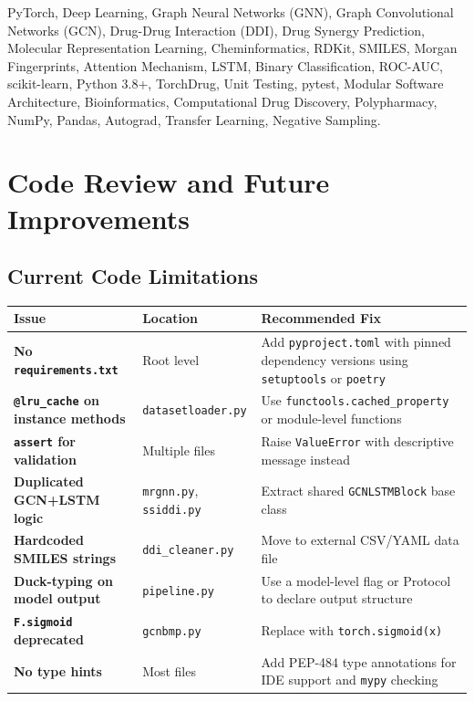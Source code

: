 \documentclass[12pt,a4paper,oneside]{book}
\begin{document}
PyTorch, Deep Learning, Graph Neural Networks (GNN), Graph Convolutional Networks (GCN),
Drug-Drug Interaction (DDI), Drug Synergy Prediction, Molecular Representation Learning,
Cheminformatics, RDKit, SMILES, Morgan Fingerprints, Attention Mechanism, LSTM,
Binary Classification, ROC-AUC, scikit-learn, Python 3.8+, TorchDrug, Unit Testing,
pytest, Modular Software Architecture, Bioinformatics, Computational Drug Discovery,
Polypharmacy, NumPy, Pandas, Autograd, Transfer Learning, Negative Sampling.

\chapter{Code Review and Future Improvements}\label{chap:improvements}

\section{Current Code Limitations}

\begin{longtable}{>{\bfseries}p{3.5cm}p{5cm}p{6cm}}
\toprule
Issue & Location & Recommended Fix \\
\midrule\endhead
No \texttt{requirements.txt} & Root level & Add \texttt{pyproject.toml} with pinned dependency versions using \texttt{setuptools} or \texttt{poetry} \\
\texttt{@lru\_cache} on instance methods & \texttt{datasetloader.py} & Use \texttt{functools.cached\_property} or module-level functions \\
\texttt{assert} for validation & Multiple files & Raise \texttt{ValueError} with descriptive message instead \\
Duplicated GCN+LSTM logic & \texttt{mrgnn.py}, \texttt{ssiddi.py} & Extract shared \texttt{GCNLSTMBlock} base class \\
Hardcoded SMILES strings & \texttt{ddi\_cleaner.py} & Move to external CSV/YAML data file \\
Duck-typing on model output & \texttt{pipeline.py} & Use a model-level flag or Protocol to declare output structure \\
\texttt{F.sigmoid} deprecated & \texttt{gcnbmp.py} & Replace with \texttt{torch.sigmoid(x)} \\
No type hints & Most files & Add PEP-484 type annotations for IDE support and \texttt{mypy} checking \\
\bottomrule
\end{longtable}
\end{document}
